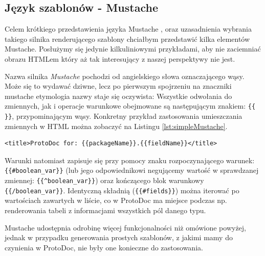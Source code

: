 \documentclass[pdflatex,11pt]{aghdpl}
\begin{document}
\subsection{Język szablonów - Mustache}
\label{sec:mustache}
Celem krótkiego przedstawienia języka Mustache \cite{Mustache}, oraz uzasadnienia wybrania takiego silnika renderującego szablony chciałbym przedstawić kilka elementów Mustache.
Posłużymy się jedynie kilkuliniowymi przykładami, aby nie zaciemniać obrazu HTMLem który aż tak interesujący z naszej perspektywy nie jest.

Nazwa silnika \textit{Mustache} pochodzi od angielskiego słowa oznaczającego wąsy. Może się to wydawać dziwne, lecz po pierwszym spojrzeniu na 
znaczniki mustache etymologia nazwy staje się oczywista: Wszystkie odwołania do zmiennych, jak i operacje warunkowe obejmowane są 
następującym znakiem: \verb|{{  }}|, przypominającym wąsy. Konkretny przykład zastosowania umieszczania zmiennych w HTML można zobaczyć na Listingu \ref{lst:simpleMustache}.

\begin{lstlisting}[label={lst:simpleMustache}]
<title>ProtoDoc for: {{packageName}}.{{fieldName}}</title>
\end{lstlisting}

Warunki natomiast zapisuje się przy pomocy znaku rozpoczynającego warunek: \verb|{{#boolean_var}}| (lub jego odpowiednikowi negującemy wartość w sprawdzanej zmiennej:
\verb|{{^boolean_var}}|) oraz kończącego blok warunkowy \verb|{{/boolean_var}}|. 
Identyczną składnią (\verb|{{#fields}}|) można iterować po wartościach zawartych w liście, co w ProtoDoc ma miejsce podczas np. renderowania
tabeli z informacjami wszystkich pól danego typu.

Mustache udostępnia odrobinę więcej funkcjonalności niż omówione powyżej, jednak w przypadku generowania prostych szablonów, 
z jakimi mamy do czynienia w ProtoDoc, nie były one konieczne do zastosowania.


% 
\end{document}
